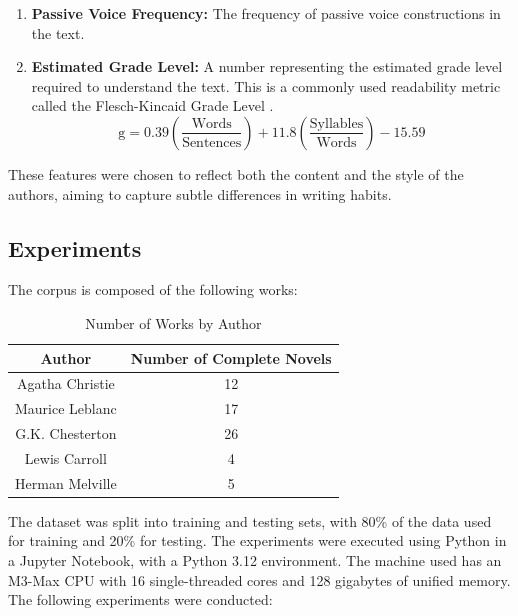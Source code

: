 \documentclass[journal]{IEEEtran} %
\begin{document}
\begin{itemize}
    \begin{enumerate}
        \item \textbf{Passive Voice Frequency:} The frequency of passive voice constructions in the text.
        \item \textbf{Estimated Grade Level:} A number representing the estimated grade level required to understand the text. This is a commonly used readability metric called the Flesch-Kincaid Grade Level \cite{flesch1975}.
        $$
        \text{g} = 0.39 \left(\frac{\text{Words}}{\text{Sentences}}\right) + 11.8 \left(\frac{\text{Syllables}}{\text{Words}}\right) - 15.59
        $$
    \end{enumerate}
\end{itemize}

These features were chosen to reflect both the content and the style of the authors, aiming to capture subtle differences in writing habits.

\subsection{Experiments}

The corpus is composed of the following works:

\begin{table}[htbp]
    \begin{center}
        \begin{tabular}{|c|c|}
            \hline
            \textbf{Author} & \textbf{Number of Complete Novels} \\
            \hline
            \hline
            Agatha Christie & 12 \\
            \hline
            Maurice Leblanc & 17 \\
            \hline
            G.K. Chesterton & 26 \\
            \hline
            Lewis Carroll & 4 \\
            \hline
            Herman Melville & 5 \\
            \hline
        \end{tabular}
        \label{tab1}
    \end{center}
    \caption{Number of Works by Author}
\end{table}

The dataset was split into training and testing sets, with 80\% of the data used for training and 20\% for testing.
The experiments were executed using Python in a Jupyter Notebook, with a Python 3.12 environment. The machine used has an M3-Max CPU with 16 single-threaded cores and 128 gigabytes of unified memory. The following experiments were conducted:
\end{document}
